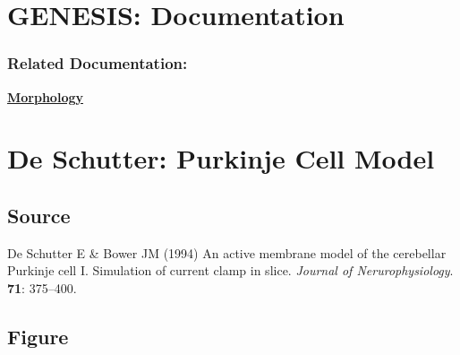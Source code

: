 \documentclass[12pt]{article}
\begin{document}
\section*{GENESIS: Documentation}

\subsubsection*{Related Documentation:}
\href{../pub-purkinje-deschutter-morphology/pub-purkinje-deschutter-morphology.tex}{\bf Morphology}

\section*{De Schutter: Purkinje Cell Model}

\subsection*{Source}

De Schutter E \& Bower JM (1994) An active membrane model of the cerebellar Purkinje cell I. Simulation of current clamp in slice. {\it Journal of Nerurophysiology}. {\bf 71}: 375--400. \\

\subsection*{Figure}
\end{document}
